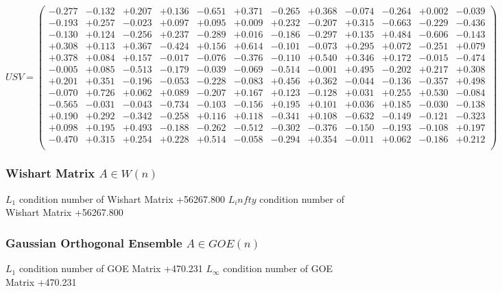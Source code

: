 \documentclass[9pt]{article}
\theoremstyle{plain}
\theoremstyle{definition}
\theoremstyle{remark}
\numberwithin{equation}{section}
\begin{document}
$U S V = \left(
\begin{array}{
cccccccccccc}
-0.277 & -0.132 & +0.207 & +0.136 & -0.651 & +0.371 & -0.265 & +0.368 & -0.074 & -0.264 & +0.002 & -0.039 \\
-0.193 & +0.257 & -0.023 & +0.097 & +0.095 & +0.009 & +0.232 & -0.207 & +0.315 & -0.663 & -0.229 & -0.436 \\
-0.130 & +0.124 & -0.256 & +0.237 & -0.289 & +0.016 & -0.186 & -0.297 & +0.135 & +0.484 & -0.606 & -0.143 \\
+0.308 & +0.113 & +0.367 & -0.424 & +0.156 & +0.614 & -0.101 & -0.073 & +0.295 & +0.072 & -0.251 & +0.079 \\
+0.378 & +0.084 & +0.157 & -0.017 & -0.076 & -0.376 & -0.110 & +0.540 & +0.346 & +0.172 & -0.015 & -0.474 \\
-0.005 & +0.085 & -0.513 & -0.179 & -0.039 & -0.069 & -0.514 & -0.001 & +0.495 & -0.202 & +0.217 & +0.308 \\
+0.201 & +0.351 & -0.196 & -0.053 & -0.228 & -0.083 & +0.456 & +0.362 & -0.044 & -0.136 & -0.357 & +0.498 \\
-0.070 & +0.726 & +0.062 & +0.089 & -0.207 & +0.167 & +0.123 & -0.128 & +0.031 & +0.255 & +0.530 & -0.084 \\
-0.565 & -0.031 & -0.043 & -0.734 & -0.103 & -0.156 & +0.195 & +0.101 & +0.036 & +0.185 & -0.030 & -0.138 \\
+0.190 & +0.292 & -0.342 & -0.258 & +0.116 & +0.118 & -0.341 & +0.108 & -0.632 & -0.149 & -0.121 & -0.323 \\
+0.098 & +0.195 & +0.493 & -0.188 & -0.262 & -0.512 & -0.302 & -0.376 & -0.150 & -0.193 & -0.108 & +0.197 \\
-0.470 & +0.315 & +0.254 & +0.228 & +0.514 & -0.058 & -0.294 & +0.354 & -0.011 & +0.062 & -0.186 & +0.212 \\
\end{array}
\right)$ \newline 

\subsubsection{Wishart Matrix $A \in W(n)$}
$L_1$ condition number of Wishart Matrix +56267.800
$L_infty$ condition number of Wishart Matrix +56267.800
\subsubsection{Gaussian Orthogonal Ensemble $A \in GOE(n)$}
$L_1$ condition number of GOE Matrix +470.231
$L_\infty$ condition number of GOE Matrix +470.231
\end{document}

